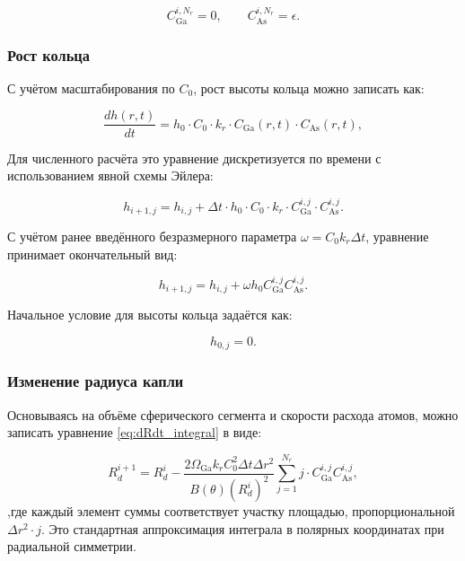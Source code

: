 \documentclass[14pt,oneside]{extarticle}
\begin{document}
\[
C_{\text{Ga}}^{i,N_r} = 0, \qquad C_{\text{As}}^{i,N_r} = \epsilon.
\]

\subsubsection{Рост кольца}

С учётом масштабирования по \( C_0 \), рост высоты кольца можно записать как:

\begin{equation}
\frac{d h(r,t)}{d t} = h_0 \cdot C_0 \cdot k_r \cdot C_{\text{Ga}}(r,t) \cdot C_{\text{As}}(r,t),
\end{equation}

Для численного расчёта это уравнение дискретизуется по времени с использованием явной схемы Эйлера:

\begin{equation}
h_{i+1,j} = h_{i,j} + \Delta t \cdot h_0 \cdot C_0 \cdot k_r \cdot C_{\text{Ga}}^{i,j} \cdot C_{\text{As}}^{i,j}.
\end{equation}

С учётом ранее введённого безразмерного параметра \( \omega = C_0 k_r \Delta t \), уравнение принимает окончательный вид:

\begin{equation}
h_{i+1,j} = h_{i,j} + \omega h_0 C_{\text{Ga}}^{i,j} C_{\text{As}}^{i,j}.
\end{equation}

Начальное условие для высоты кольца задаётся как:

\begin{equation}
h_{0,j} = 0.
\end{equation}

\subsubsection{Изменение радиуса капли}

Основываясь на объёме сферического сегмента и скорости расхода атомов, можно записать уравнение \eqref{eq:dRdt_integral} в виде:

\begin{equation}
R_d^{i+1} = R_d^i - \frac{2 \Omega_{\text{Ga}} k_r C_0^2 \Delta t \Delta r^2}{B(\theta) (R_d^i)^2} \sum_{j=1}^{N_r} j \cdot C_{\text{Ga}}^{i,j} C_{\text{As}}^{i,j},
\end{equation}
,где каждый элемент суммы соответствует участку площадью, пропорциональной $\Delta r^2 \cdot j$. Это стандартная аппроксимация интеграла в полярных координатах при радиальной симметрии.
\end{document}
